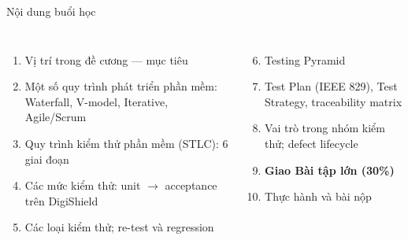 \documentclass[aspectratio=169,12pt]{beamer}
\begin{document}
\begin{frame}{Nội dung buổi học}
  \begin{columns}[T]
    \begin{enumerate}
      \item Vị trí trong đề cương --- mục tiêu
      \item Một số quy trình phát triển phần mềm: Waterfall, V-model, Iterative, Agile/Scrum
      \item Quy trình kiểm thử phần mềm (STLC): 6 giai đoạn
      \item Các mức kiểm thử: unit $\to$ acceptance trên DigiShield
      \item Các loại kiểm thử; re-test và regression
    \end{enumerate}
    \begin{enumerate}
      \setcounter{enumi}{5}
      \item Testing Pyramid
      \item Test Plan (IEEE 829), Test Strategy, traceability matrix
      \item Vai trò trong nhóm kiểm thử; defect lifecycle
      \item \textbf{Giao Bài tập lớn (30\%)}
      \item Thực hành và bài nộp
    \end{enumerate}
  \end{columns}
\end{frame}
\end{document}

